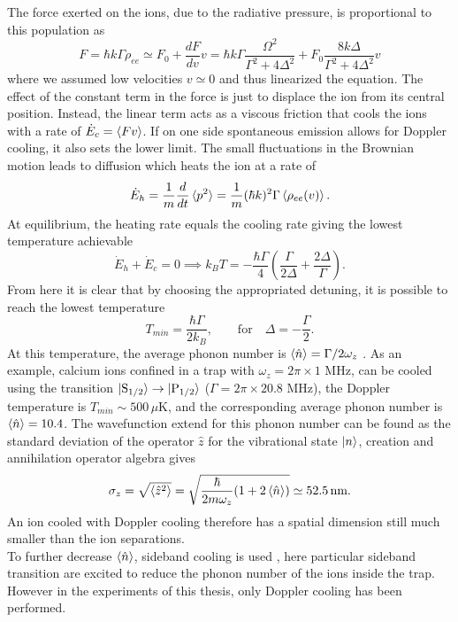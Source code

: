 The force exerted on the ions, due to the radiative pressure, is proportional to this population as
\begin{equation}
F = \hbar k \Gamma \rho_{ee} \simeq F_0 + \frac{dF}{dv}v = \hbar k \Gamma\frac{\Omega^2}{\Gamma^2 +4\Delta^2} + F_0 \frac{8k\Delta}{\Gamma^2 + 4\Delta^2}v
\end{equation}
where we assumed low velocities $v \simeq 0$ and thus linearized the equation. The effect of the constant term in the force is just to displace the ion from its central position. Instead, the linear term acts as a viscous friction that cools the ions with a rate of $\dot{E}_c = \braket{Fv}$.
If on one side spontaneous emission allows for Doppler cooling, it also sets the lower limit. The small fluctuations in the Brownian motion leads to diffusion which heats the ion at a rate of
\begin{equation}
\dot{E}_h = \frac{1}{m}\frac{d}{dt}\braket{p^2} =  \frac{1}{m}(\hbar k)^2 \Gamma \braket{\rho_{ee}(v)}.
\end{equation}
At equilibrium, the heating rate equals the cooling rate giving the lowest temperature achievable
\begin{equation}
\dot{E}_h + \dot{E}_c = 0  \implies k_B T = -\frac{\hbar \Gamma}{4}\left(\frac{\Gamma}{2\Delta} +\frac{2\Delta}{\Gamma}\right).
\end{equation}
From here it is clear that by choosing the appropriated detuning, it is possible to reach the lowest temperature
\begin{equation}
T_{min} = \frac{\hbar \Gamma}{2k_{B}}, \qquad \text{for} \quad \Delta = -\frac{\Gamma}{2}.
\end{equation}
At this temperature, the average phonon number is $\braket{\hat{n}} = \Gamma /2\omega_z$ \cite{Eschner:03}. As an example, calcium ions confined in a trap with $\omega_z = 2\pi\times 1$ MHz, can be cooled using the transition $\ket{\text{S}_{1/2}}\to \ket{\text{P}_{1/2}}$ ($\Gamma = 2\pi\times 20.8$ MHz), the Doppler temperature is $T_{min} \sim 500\,\mu$K, and the corresponding average phonon number is $\braket{\hat{n}} = 10.4$. The wavefunction extend for this phonon number can be found as the standard deviation of the operator $\hat{z}$ for the vibrational state $\ket{n}$, creation and annihilation operator algebra gives
\begin{equation}
\sigma_z = \sqrt{\braket{\hat{z}^2}} = \sqrt{\frac{\hbar}{2m\omega_z}(1+2\braket{\hat{n}})} \simeq 52.5\,\text{nm}.
\end{equation}
An ion cooled with Doppler cooling therefore has a spatial dimension still much smaller than the ion separations.\\
To further decrease $\braket{\hat{n}}$, sideband cooling is used \cite{Eschner:03}, here particular sideband transition are excited to reduce the phonon number of the ions inside the trap. However in the experiments of this thesis, only Doppler cooling has been performed.\\


